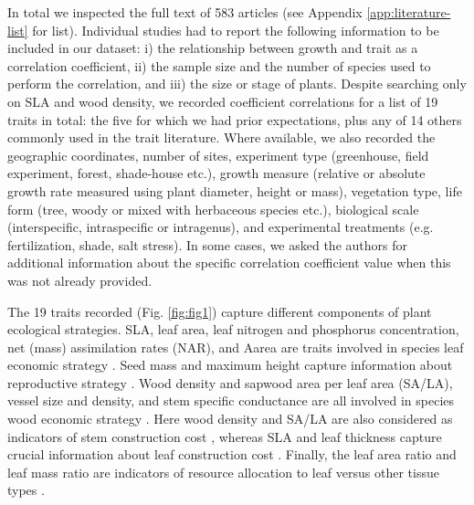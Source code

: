 \documentclass[a4paper,11pt]{article}
\begin{document}
In total we inspected the full text of 583 articles (see Appendix \ref{app:literature-list} for list). Individual studies had to report the following information to be included in our dataset: i) the relationship between growth and trait as a correlation coefficient, ii) the sample size and the number of species used to perform the correlation, and iii) the size or stage of plants. Despite searching only on SLA and wood density, we recorded coefficient correlations for a list of 19 traits in total: the five for which we had prior expectations, plus any of 14 others commonly used in the trait literature. Where available, we also recorded the geographic coordinates, number of sites, experiment type (greenhouse, field experiment, forest, shade-house etc.), growth measure (relative or absolute growth rate measured using plant diameter, height or mass), vegetation type, life form (tree, woody or mixed with herbaceous species etc.), biological scale (interspecific, intraspecific or intragenus), and experimental treatments (e.g. fertilization, shade, salt stress). In some cases, we asked the authors for additional information about the specific correlation coefficient value when this was not already provided.

The 19 traits recorded (Fig. \ref{fig:fig1}) capture different components of plant ecological strategies. SLA, leaf area, leaf nitrogen and phosphorus concentration, net (mass) assimilation rates (NAR), and Aarea are traits involved in species leaf economic strategy \citep{Wright:2004jb,Wright:2010tp}. Seed mass and maximum height capture information about reproductive strategy \citep{Falster:2005bw,Moles:2006ft}. Wood density and sapwood area per leaf area (SA/LA), vessel size and density, and stem specific conductance are all involved in species wood economic strategy  \citep{Chave:2009iy}. Here wood density and SA/LA are also considered as indicators of stem construction cost \citep{Falster:2011ii}, whereas SLA and leaf thickness capture crucial information about leaf construction cost \citep{Wright:2004jb}. Finally, the leaf area ratio and leaf mass ratio are indicators of resource allocation to leaf versus other tissue types \citep{Lambers:1992bj}.
\end{document}
